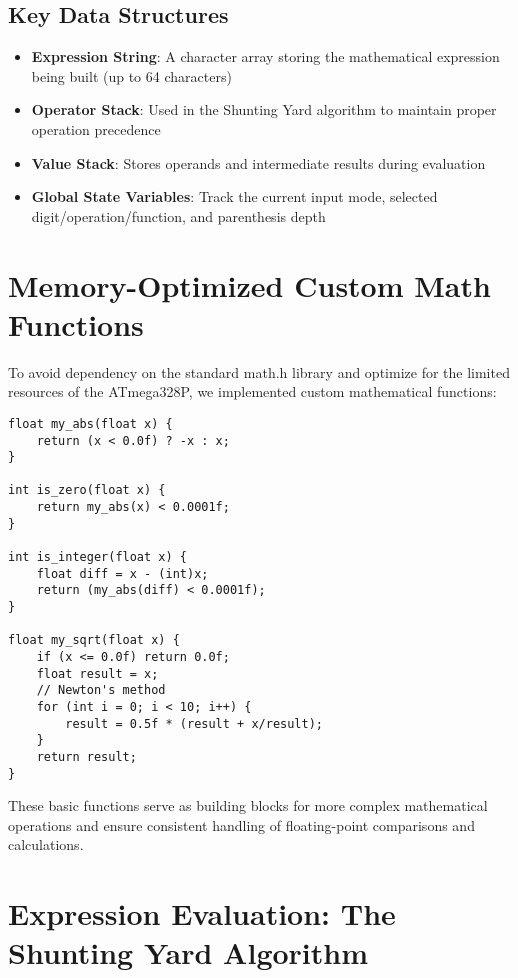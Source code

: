 \documentclass[12pt,a4paper]{article}
\begin{document}
\subsection{Key Data Structures}

\begin{itemize}
    \item \textbf{Expression String}: A character array storing the mathematical expression being built (up to 64 characters)
    \item \textbf{Operator Stack}: Used in the Shunting Yard algorithm to maintain proper operation precedence
    \item \textbf{Value Stack}: Stores operands and intermediate results during evaluation
    \item \textbf{Global State Variables}: Track the current input mode, selected digit/operation/function, and parenthesis depth
\end{itemize}

\section{Memory-Optimized Custom Math Functions}

To avoid dependency on the standard math.h library and optimize for the limited resources of the ATmega328P, we implemented custom mathematical functions:

\begin{lstlisting}
float my_abs(float x) {
    return (x < 0.0f) ? -x : x;
}

int is_zero(float x) {
    return my_abs(x) < 0.0001f;
}

int is_integer(float x) {
    float diff = x - (int)x;
    return (my_abs(diff) < 0.0001f);
}

float my_sqrt(float x) {
    if (x <= 0.0f) return 0.0f;
    float result = x;
    // Newton's method
    for (int i = 0; i < 10; i++) {
        result = 0.5f * (result + x/result);
    }
    return result;
}
\end{lstlisting}

These basic functions serve as building blocks for more complex mathematical operations and ensure consistent handling of floating-point comparisons and calculations.

\section{Expression Evaluation: The Shunting Yard Algorithm}
\end{document}
